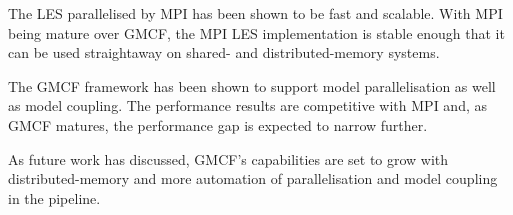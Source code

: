 The LES parallelised by MPI has been shown to be fast and scalable. With MPI
being mature over GMCF, the MPI LES implementation is stable enough that it can
be used straightaway on shared- and distributed-memory systems.

The GMCF framework has been shown to support model parallelisation as well as
model coupling. The performance results are competitive with MPI and, as GMCF
matures, the performance gap is expected to narrow further.

As future work has discussed, GMCF's capabilities are set to grow with
distributed-memory and more automation of parallelisation and model coupling in
the pipeline.
